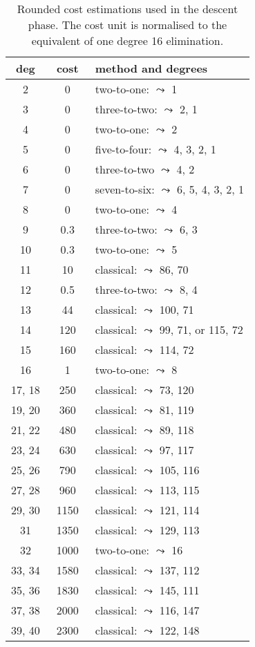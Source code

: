 \documentclass[11pt]{llncs}
\begin{document}
\begin{table}
  \begin{center}
    \caption{Rounded cost estimations used in the descent phase.  The cost
      unit is normalised to the equivalent of one degree 16 elimination.}
    \label{tab:cost} \small
    \begin{tabular}{ccl}
      deg & cost & method and degrees \\\hline
      2 & 0 & two-to-one: $\leadsto$ 1 \\
      3 & 0 & three-to-two: $\leadsto$ 2, 1 \\
      4 & 0 & two-to-one: $\leadsto$ 2 \\
      5 & 0 & five-to-four: $\leadsto$ 4, 3, 2, 1 \\
      6 & 0 & three-to-two $\leadsto$ 4, 2 \\
      7 & 0 & seven-to-six: $\leadsto$ 6, 5, 4, 3, 2, 1 \\
      8 & 0 & two-to-one: $\leadsto$ 4 \\
      9 & 0.3 & three-to-two: $\leadsto$ 6, 3 \\
      10 & 0.3 & two-to-one: $\leadsto$ 5 \\
      11 & 10 & classical: $\leadsto$ 86, 70 \\
      12 & 0.5 & three-to-two: $\leadsto$ 8, 4 \\
      13 & 44 & classical: $\leadsto$ 100, 71 \\
      14 & 120 & classical: $\leadsto$ 99, 71, or 115, 72 \\
      15 & 160 & classical: $\leadsto$ 114, 72 \\
      16 & 1 & two-to-one: $\leadsto$ 8 \\
      17, 18 & 250 & classical: $\leadsto$ 73, 120 \\
      19, 20 & 360 & classical: $\leadsto$ 81, 119 \\
      21, 22 & 480 & classical: $\leadsto$ 89, 118 \\
      23, 24 & 630 & classical: $\leadsto$ 97, 117 \\
      25, 26 & 790 & classical: $\leadsto$ 105, 116 \\
      27, 28 & 960 & classical: $\leadsto$ 113, 115 \\
      29, 30 & \num{1150} & classical: $\leadsto$ 121, 114 \\
      31 & \num{1350} & classical: $\leadsto$ 129, 113 \\
      32 & \num{1000} & two-to-one: $\leadsto$ 16 \\
      33, 34 & \num{1580} & classical: $\leadsto$ 137, 112 \\
      35, 36 & \num{1830} & classical: $\leadsto$ 145, 111 \\
      37, 38 & \num{2000} & classical: $\leadsto$ 116, 147 \\
      39, 40 & ~\num{2300}~ & classical: $\leadsto$ 122, 148 \\
    \end{tabular}
  \end{center}
\end{table}
\end{document}

